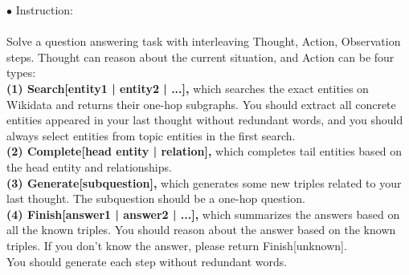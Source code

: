 


\begin{tcolorbox}[prompt=
{\begin{prompt} \label{prompts for instruction used in KGQA inference.} The Prompt for the Inference Phase of JCQL
\end{prompt}}]

$\bullet$ Instruction: \\ \\
Solve a question answering task with interleaving Thought, Action, Observation steps. Thought can reason about the current situation, and Action can be four types:  \\
\textbf{(1) Search[entity1 | entity2 | ...],} which searches the exact entities on Wikidata and returns their one-hop subgraphs. You should extract all concrete entities appeared in your last thought without redundant words, and you should always select entities from topic entities in the first search.  \\
\textbf{(2) Complete[head entity | relation],} which completes tail entities based on the head entity and relationships. \\ 
\textbf{(3) Generate[subquestion],} which generates some new triples related to your last thought. The subquestion should be a one-hop question.  \\
\textbf{(4) Finish[answer1 | answer2 | ...],} which summarizes the answers based on all the known triples. You should reason about the answer based on the known triples. If you don't know the answer, please return Finish[unknown]. \\
You should generate each step without redundant words. \\


\end{tcolorbox}
